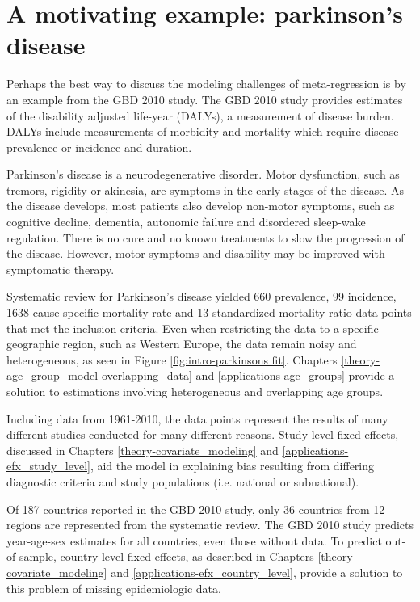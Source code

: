 \section{A motivating example: parkinson's disease}
\label{intro-complete_ex}

Perhaps the best way to discuss the modeling challenges of meta-regression is by an example from the GBD 2010 study.  The GBD 2010 study provides estimates of the disability adjusted life-year (DALYs), a measurement of disease burden.  DALYs include measurements of morbidity and mortality which require disease prevalence or incidence and duration.

Parkinson's disease is a neurodegenerative disorder.  Motor dysfunction, such as tremors, rigidity or akinesia, are symptoms in the early stages of the disease.  As the disease develops, most patients also develop non-motor symptoms, such as cognitive decline, dementia, autonomic failure and disordered sleep-wake regulation.  There is no cure and no known treatments to slow the progression of the disease.  However, motor symptoms and disability may be improved with symptomatic therapy. \cite{poewe_natural_2006, pollock_prevalence_1966}

Systematic review for Parkinson's disease yielded 660 prevalence, 99 incidence, 1638 cause-specific mortality rate and 13 standardized mortality ratio data points that met the inclusion criteria.  Even when restricting the data to a specific geographic region, such as Western Europe, the data remain noisy and heterogeneous, as seen in Figure \ref{fig:intro-parkinsons fit}. Chapters \ref{theory-age_group_model-overlapping_data} and \ref{applications-age_groups} provide a solution to estimations involving heterogeneous and overlapping age groups.

Including data from 1961-2010, the data points represent the results of many different studies conducted for many different reasons.  Study level fixed effects, discussed in Chapters \ref{theory-covariate_modeling} and \ref{applications-efx_study_level}, aid the model in explaining bias resulting from differing diagnostic criteria and study populations (i.e. national or subnational).

Of 187 countries reported in the GBD 2010 study, only 36 countries from 12 regions are represented from the systematic review.  The GBD 2010 study predicts year-age-sex estimates for all countries, even those without data.  To predict out-of-sample, country level fixed effects, as described in Chapters \ref{theory-covariate_modeling} and \ref{applications-efx_country_level}, provide a solution to this problem of missing epidemiologic data.

